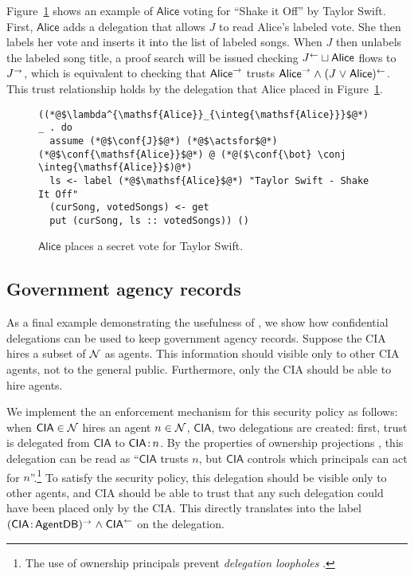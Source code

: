Figure~\ref{fig:jukebox-alice-votes-for-taylor-swift} shows an example of $\mathsf{Alice}$ voting for ``Shake it Off'' by Taylor Swift. First, $\mathsf{Alice}$ adds a delegation that allows $J$ to read Alice's labeled vote. She then labels her vote and inserts it into the list of labeled songs. When $J$ then unlabels the labeled song title, a proof search will be issued checking $J^{\leftarrow} \sqcup \mathsf{Alice}$ flows to $J^{\rightarrow}$, which is equivalent to checking that $\mathsf{Alice}^{\rightarrow}$ trusts $\mathsf{Alice}^{\rightarrow} \mathrel{\land} (J \mathrel{\lor} \mathsf{Alice})^{\leftarrow}$. This trust relationship holds by the delegation that Alice placed in Figure~\ref{fig:jukebox-alice-votes-for-taylor-swift}.

\begin{figure}
\centering
\begin{lstlisting}
((*@$\lambda^{\mathsf{Alice}}_{\integ{\mathsf{Alice}}}$@*) _ . do
  assume (*@$\conf{J}$@*) (*@$\actsfor$@*) (*@$\conf{\mathsf{Alice}}$@*) @ (*@($\conf{\bot} \conj \integ{\mathsf{Alice}}$)@*)
  ls <- label (*@$\mathsf{Alice}$@*) "Taylor Swift - Shake It Off"
  (curSong, votedSongs) <- get
  put (curSong, ls :: votedSongs)) ()
\end{lstlisting}
\caption{$\mathsf{Alice}$ places a secret vote for Taylor Swift.}
\label{fig:jukebox-alice-votes-for-taylor-swift}
\end{figure}

\subsection{Government agency records}\label{subsec:agents}
As a final example demonstrating the usefulness of \lang, we show how confidential delegations can be used to keep government agency records. Suppose the CIA hires a subset of $\mathcal{N}$  as agents. 
This information should visible only to other CIA agents, not to the general public. Furthermore, only the CIA should be able to hire agents.

We implement the an enforcement mechanism for this security policy as follows: when $\mathsf{CIA} \in \mathcal{N}$ hires an agent $n \in \mathcal{N}$, $\mathsf{CIA}$, two delegations are created: first, trust is delegated from $\mathsf{CIA}$ to $\mathsf{CIA} \colon \!n$. By the properties of ownership projections \cite{Arden:2015:FA:2859845.2859998}, this delegation can be read as ``$\mathsf{CIA}$ trusts $n$, but $\mathsf{CIA}$ controls which principals can act for $n$''.\footnote{The use of ownership principals prevent \emph{delegation loopholes} \cite{Arden:2015:FA:2859845.2859998}.} To satisfy the security policy, this delegation should be visible only to other agents, and CIA should be able to trust that any such delegation could have been placed only by the CIA. This directly translates into the label $(\mathsf{CIA} \colon \!\mathsf{AgentDB})^{\rightarrow} \mathrel{\land} \mathsf{CIA}^{\leftarrow}$ on the delegation.

